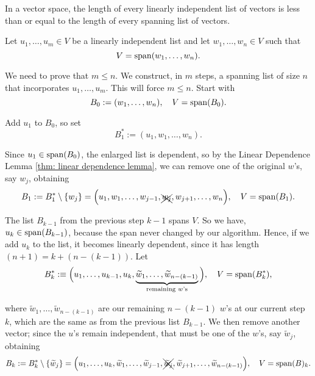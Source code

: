 \setcounter{thm}{21}
\begin{thm}  
  \label{thm: length of linearly dependent list less or equal to length of spanning list}
  In a \fd vector space, the length of every linearly independent list of vectors is less than or equal to the length of every spanning list of vectors.
\end{thm}
\begin{prf}
  Let $u_1, \ldots, u_m \in V$ be a linearly independent list and let $w_1, \ldots, w_n \in V$ such that \begin{equation}
    V=\operatorname{span} (w_1, \ldots, w_n).
  \end{equation}

  We need to prove that $m \leq n$.
  We construct, in $m$ steps, a spanning list of size $n$ that incorporates $u_1,\dots,u_m$. This will force $m\le n$.  Start with
  \[
      B_0 :=  (w_1, \dots, w_n),
      \quad V = \operatorname{span} (B_0).
  \]

   Add $u_1$ to $B_0$, so set
  \begin{equation}
    B_1^* := (u_1, w_1, \ldots, w_n).
  \end{equation}

  Since $u_1 \in \operatorname{span} (B_0)$, the enlarged list is dependent, so by the Linear Dependence Lemma \ref{thm: linear dependence lemma}, we can remove one of the original $w$'s, say $w_j$, obtaining
  \begin{equation*}
    B_1 := B_1^* \setminus \{w_j\} = \Big(u_1, w_1, \ldots, w_{j-1}, \xcancel{w_j}, w_{j+1}, \ldots, w_n\Big), \quad V=\operatorname{span} (B_1).
  \end{equation*}

   The list $B_{k-1}$ from the previous step $k-1$ spans $V$. So we have, $u_{k} \in \operatorname{span} (B_{k-1})$, because the span never changed by our algorithm. Hence, if we add $u_k$ to the list, it becomes linearly dependent, since it has length $(n+1) = k + (n-(k-1))$. Let
  \begin{equation*}
    B_k^* :\equiv \Big(u_1, \ldots, u_{k-1}, u_k, \underbrace{\widetilde w_{1}, \ldots, \widetilde w_{n-(k-1)} }_{\text{remaining $w$'s}} \Big), \quad V=\operatorname{span} (B_k^*),
  \end{equation*}

  where $\widetilde w_{1}, \ldots, \widetilde w_{n-(k-1)}$ are our remaining $n-(k-1)$ $w$'s at our current step $k$, which are the same as from the previous list $B_{k-1}$. We then remove another vector; since the $u$'s remain independent, that must be one of the $w$'s, say $\widetilde w_j$, obtaining
  \begin{equation*}
    B_k := B_k^* \setminus \{\widetilde w_j \} = \Big(u_1, \ldots, u_{k},  \widetilde w_1, \ldots, \widetilde w_{j-1}, \xcancel{\widetilde w_j}, \widetilde w_{j+1}, \ldots, \widetilde w_{n-(k-1)}\Big), \quad V=\operatorname{span} (B)_k.
  \end{equation*}


\end{prf}
